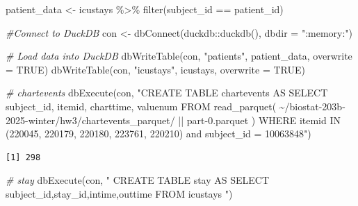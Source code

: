 \documentclass[
]{article}
\newenvironment{Shaded}{\begin{snugshade}}{\end{snugshade}}
\newcommand{\AttributeTok}[1]{\textcolor[rgb]{0.77,0.63,0.00}{#1}}
\newcommand{\CommentTok}[1]{\textcolor[rgb]{0.56,0.35,0.01}{\textit{#1}}}
\newcommand{\ConstantTok}[1]{\textcolor[rgb]{0.00,0.00,0.00}{#1}}
\newcommand{\FunctionTok}[1]{\textcolor[rgb]{0.00,0.00,0.00}{#1}}
\newcommand{\NormalTok}[1]{\textcolor[rgb]{0.00,0.00,0.00}{#1}}
\newcommand{\OtherTok}[1]{\textcolor[rgb]{0.56,0.35,0.01}{#1}}
\newcommand{\SpecialCharTok}[1]{\textcolor[rgb]{0.00,0.00,0.00}{#1}}
\newcommand{\StringTok}[1]{\textcolor[rgb]{0.31,0.60,0.02}{#1}}
\begin{document}
\begin{Shaded}
\begin{Highlighting}[]
\NormalTok{patient\_data }\OtherTok{\textless{}{-}}\NormalTok{ icustays }\SpecialCharTok{\%\textgreater{}\%} \FunctionTok{filter}\NormalTok{(subject\_id }\SpecialCharTok{==}\NormalTok{ patient\_id)}
\end{Highlighting}
\end{Shaded}

\begin{Shaded}
\begin{Highlighting}[]
\CommentTok{\#Connect to DuckDB}
\NormalTok{con }\OtherTok{\textless{}{-}} \FunctionTok{dbConnect}\NormalTok{(duckdb}\SpecialCharTok{::}\FunctionTok{duckdb}\NormalTok{(), }\AttributeTok{dbdir =} \StringTok{":memory:"}\NormalTok{)}

\CommentTok{\#  Load \textasciigrave{}data\textasciigrave{} into DuckDB}
\FunctionTok{dbWriteTable}\NormalTok{(con, }\StringTok{"patients"}\NormalTok{, patient\_data, }\AttributeTok{overwrite =} \ConstantTok{TRUE}\NormalTok{)}
\FunctionTok{dbWriteTable}\NormalTok{(con, }\StringTok{"icustays"}\NormalTok{, icustays, }\AttributeTok{overwrite =} \ConstantTok{TRUE}\NormalTok{)}
\end{Highlighting}
\end{Shaded}

\begin{Shaded}
\begin{Highlighting}[]
\CommentTok{\# chartevents}
\FunctionTok{dbExecute}\NormalTok{(con, }\StringTok{"CREATE TABLE chartevents AS }
\StringTok{                SELECT subject\_id, itemid, charttime, valuenum }
\StringTok{                FROM read\_parquet(}
\StringTok{    \textquotesingle{}\textasciitilde{}/biostat{-}203b{-}2025{-}winter/hw3/chartevents\_parquet/\textquotesingle{} || }
\StringTok{    \textquotesingle{}part{-}0.parquet\textquotesingle{}}
\StringTok{  )}
\StringTok{                WHERE itemid IN (220045, 220179, 220180, 223761, 220210) and }
\StringTok{                subject\_id = 10063848"}\NormalTok{)}
\end{Highlighting}
\end{Shaded}

\begin{verbatim}
[1] 298
\end{verbatim}

\begin{Shaded}
\begin{Highlighting}[]
\CommentTok{\# stay }
\FunctionTok{dbExecute}\NormalTok{(con, }\StringTok{"}
\StringTok{  CREATE TABLE stay AS}
\StringTok{  SELECT subject\_id,stay\_id,intime,outtime}
\StringTok{  FROM icustays}
\StringTok{"}\NormalTok{)}
\end{Highlighting}
\end{Shaded}
\end{document}
